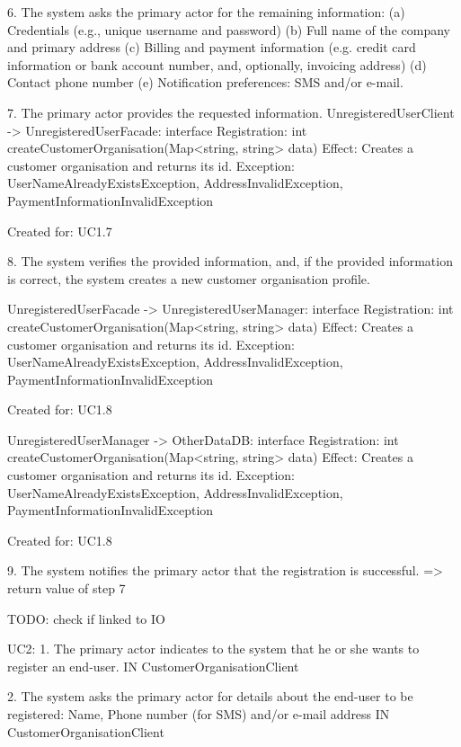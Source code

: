         6. The system asks the primary actor for the remaining information:
           (a) Credentials (e.g., unique username and password)
           (b) Full name of the company and primary address
           (c) Billing and payment information (e.g. credit card information or bank account number,
               and, optionally, invoicing address)
           (d) Contact phone number
           (e) Notification preferences: SMS and/or e-mail.

        7. The primary actor provides the requested information.
            UnregisteredUserClient -> UnregisteredUserFacade: interface Registration: int createCustomerOrganisation(Map<string, string> data)
                Effect: Creates a customer organisation and returns its id.
                Exception: UserNameAlreadyExistsException, AddressInvalidException, PaymentInformationInvalidException
                \item Created for: UC1.7

        8. The system verifies the provided information, and, if the provided information is correct, the
           system creates a new customer organisation profile.

            UnregisteredUserFacade -> UnregisteredUserManager: interface Registration: int createCustomerOrganisation(Map<string, string> data)
                Effect: Creates a customer organisation and returns its id.
                Exception: UserNameAlreadyExistsException, AddressInvalidException, PaymentInformationInvalidException
                \item Created for: UC1.8

            UnregisteredUserManager -> OtherDataDB: interface Registration: int createCustomerOrganisation(Map<string, string> data)
                Effect: Creates a customer organisation and returns its id.
                Exception: UserNameAlreadyExistsException, AddressInvalidException, PaymentInformationInvalidException
                \item Created for: UC1.8

        9. The system notifies the primary actor that the registration is successful.
            => return value of step 7

        TODO: check if linked to IO


    UC2:
        1. The primary actor indicates to the system that he or she wants to register an end-user.
            IN CustomerOrganisationClient

        2. The system asks the primary actor for details about the end-user to be registered:
           Name, Phone number (for SMS) and/or e-mail address
           IN CustomerOrganisationClient

